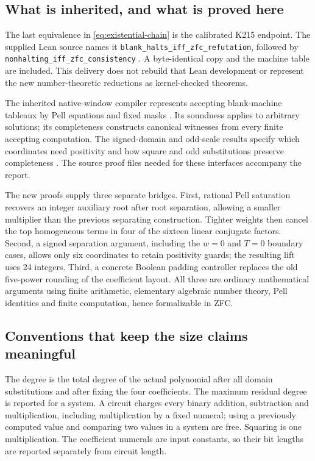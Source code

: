 \subsection{What is inherited, and what is proved here}

The last equivalence in \eqref{eq:existential-chain} is the calibrated
K215 endpoint.  The supplied Lean source names it
\texttt{blank\_halts\_iff\_zfc\_refutation}, followed by
\texttt{nonhalting\_iff\_zfc\_consistency} \cite{K215}.  A byte-identical
copy and the machine table are included.  This delivery does not rebuild
that Lean development or represent the new number-theoretic reductions
as kernel-checked theorems.

The inherited native-window compiler represents accepting blank-machine
tableaux by Pell equations and fixed masks
\cite{baseline67,normalized,wang}.  Its soundness applies to arbitrary
solutions; its completeness constructs canonical witnesses from every
finite accepting computation.  The signed-domain and odd-scale results
specify which coordinates need positivity and how square and odd
substitutions preserve completeness \cite{normalized,oddscale}.
The source proof files needed for these interfaces accompany the report.

The new proofs supply three separate bridges.  First, rational Pell
saturation recovers an integer auxiliary root after root separation,
allowing a smaller multiplier than the previous separating construction.
Tighter weights then cancel the top homogeneous terms in four of the
sixteen linear conjugate factors.  Second, a signed separation argument,
including the $w=0$ and $T=0$ boundary cases, allows only six coordinates
to retain positivity guards; the resulting lift uses 24 integers.
Third, a concrete Boolean padding controller replaces the old
five-power rounding of the coefficient layout.  All three are ordinary
mathematical arguments using finite arithmetic, elementary algebraic
number theory, Pell identities and finite computation, hence formalizable
in ZFC.

\subsection{Conventions that keep the size claims meaningful}

The degree is the total degree of the actual polynomial after all domain
substitutions and after fixing the four coefficients.  The maximum
residual degree is reported for a system.  A circuit charges every binary
addition, subtraction and multiplication, including multiplication by a
fixed numeral; using a previously computed value and comparing two
values in a system are free.  Squaring is one multiplication.  The
coefficient numerals are input constants, so their bit lengths are
reported separately from circuit length.

